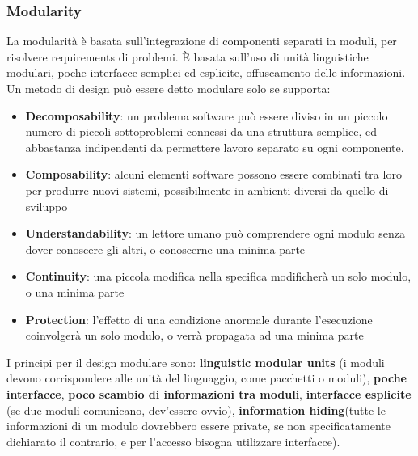 \documentclass[11pt]{article}
\begin{document}
\subsubsection{Modularity}
La modularità è basata sull'integrazione di componenti separati in moduli, per risolvere requirements di problemi. 
È basata sull'uso di unità linguistiche modulari, poche interfacce semplici ed esplicite, offuscamento delle informazioni. Un metodo di design può essere detto modulare solo se supporta:
\begin{itemize}
    \item \textbf{Decomposability}: un problema software può essere diviso in un piccolo numero di piccoli sottoproblemi connessi da una struttura semplice, ed abbastanza indipendenti da permettere lavoro separato su ogni componente. 
    \item \textbf{Composability}: alcuni elementi software possono essere combinati tra loro per produrre nuovi sistemi, possibilmente in ambienti diversi da quello di sviluppo 
    \item \textbf{Understandability}: un lettore umano può comprendere ogni modulo senza dover conoscere gli altri, o conoscerne una minima parte 
    \item \textbf{Continuity}: una piccola modifica nella specifica modificherà un solo modulo, o una minima parte 
    \item \textbf{Protection}: l'effetto di una condizione anormale durante l'esecuzione coinvolgerà un solo modulo, o verrà propagata ad una minima parte 
\end{itemize}
I principi per il design modulare sono: \textbf{linguistic modular units} (i moduli devono corrispondere alle unità del linguaggio, come pacchetti o moduli), \textbf{poche interfacce}, \textbf{poco scambio di informazioni tra moduli}, \textbf{interfacce esplicite} (se due moduli comunicano, dev'essere ovvio), \textbf{information hiding}(tutte le informazioni di un modulo dovrebbero essere private, se non specificatamente dichiarato il contrario, e per l'accesso bisogna utilizzare interfacce). 
\end{document}
